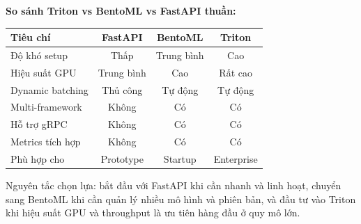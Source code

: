 \begin{mdframed}[style=infobox]
\textbf{So sánh Triton vs BentoML vs FastAPI thuần:}

\begin{center}
\begin{tabular}{lccc}
\hline
\textbf{Tiêu chí} & \textbf{FastAPI} & \textbf{BentoML} & \textbf{Triton} \\
\hline
Độ khó setup       & Thấp     & Trung bình & Cao        \\
Hiệu suất GPU      & Trung bình & Cao       & Rất cao    \\
Dynamic batching   & Thủ công  & Tự động    & Tự động    \\
Multi-framework    & Không     & Có         & Có         \\
Hỗ trợ gRPC        & Không     & Có         & Có         \\
Metrics tích hợp   & Không     & Có         & Có         \\
Phù hợp cho        & Prototype & Startup    & Enterprise \\
\hline
\end{tabular}
\end{center}

Nguyên tắc chọn lựa: bắt đầu với FastAPI khi cần nhanh và linh hoạt, chuyển sang BentoML khi cần quản lý nhiều mô hình và phiên bản, và đầu tư vào Triton khi hiệu suất GPU và throughput là ưu tiên hàng đầu ở quy mô lớn.
\end{mdframed}
